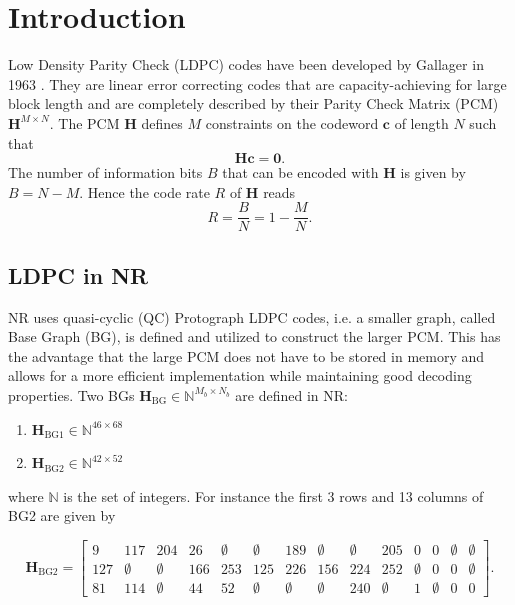 \documentclass{article}
\def\0{\mathbf{0}}
\def\c{\mathbf{c}}
\def\H{\mathbf{H}}
\def\Hbg{\mathbf{H}_\mathrm{BG}}
\def\Hbgo{\mathbf{H}_\mathrm{BG1}}
\def\Hbgt{\mathbf{H}_\mathrm{BG2}}
\def\Mb{{M_b}}
\def\Nb{{N_b}}
\def\Nbb{\mathbb{N}}
\begin{document}
\newpage
\tableofcontents

\newpage
\section{Introduction}
\label{sec:introduction}

Low Density Parity Check (LDPC) codes have been developed by Gallager in 1963 \cite{gallager1962low}. They are linear error correcting codes that are capacity-achieving for large block length and are completely described by their Parity Check Matrix (PCM) $\H^{M\times N}$. The PCM $\H$ defines $M$ constraints on the codeword $\c$ of length $N$ such that
\begin{equation}
  \label{eq:29}
  \H\c = \0.
\end{equation}
The number of information bits $B$ that can be encoded with $\H$ is given by $B=N-M$. Hence the code rate $R$ of $\H$ reads
\begin{equation}
  \label{eq:37}
  R = \frac{B}{N} = 1-\frac{M}{N}.
\end{equation}


\subsection{LDPC in NR}
\label{sec:ldpc-nr}

NR uses quasi-cyclic (QC) Protograph LDPC codes, i.e. a smaller graph, called Base Graph (BG), is defined and utilized to construct the larger PCM. This has the advantage that the large PCM does not have to be stored in memory and allows for a more efficient implementation while maintaining good decoding properties.
Two BGs $\Hbg\in\Nbb^{\Mb\times \Nb}$ are defined in NR:
\begin{enumerate}
\item $\Hbgo\in\Nbb^{46\times 68}$
\item $\Hbgt\in\Nbb^{42\times 52}$
\end{enumerate}
where $\Nbb$ is the set of integers. For instance the first 3 rows and 13 columns of BG2 are given by

\setcounter{MaxMatrixCols}{30}
\begin{equation*}
  \label{eq:33}
  \Hbgt =
  \begin{bmatrix}
    9   & 117       & 204       & 26  & \emptyset & \emptyset & 189       & \emptyset & \emptyset & 205       & 0         & 0         & \emptyset & \emptyset \\
    127 & \emptyset & \emptyset & 166 & 253       & 125       & 226       & 156       & 224       & 252       & \emptyset & 0         & 0         & \emptyset \\
    81  & 114       & \emptyset & 44  & 52        & \emptyset & \emptyset & \emptyset & 240       & \emptyset & 1         & \emptyset & 0         & 0
  \end{bmatrix}.
\end{equation*}
\end{document}
